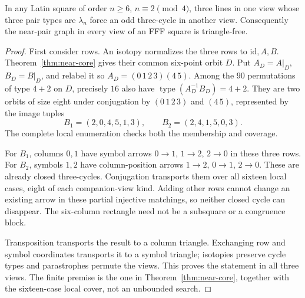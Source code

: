 \begin{computationaltheorem}
\label{thm:near-triangle}
In any Latin square of order $n\geq6$, $n\equiv2\pmod4$, three lines
in one view whose three pair types are $\lambda_n$ force an odd
three-cycle in another view. Consequently the near-pair graph in
every view of an FFF square is triangle-free.
\end{computationaltheorem}
\begin{proof}
First consider rows. An isotopy normalizes the three rows to
$\mathrm{id},A,B$. Theorem~\ref{thm:near-core} gives their common
six-point orbit $D$. Put $A_D=A|_D$, $B_D=B|_D$, and relabel it so
$A_D=(0\,1\,2\,3)(4\,5)$.
Among the $90$ permutations of type $4+2$ on $D$, precisely $16$
also have $\operatorname{type}(A_D^{-1}B_D)=4+2$. They are two orbits of
size eight under conjugation by $(0\,1\,2\,3)$ and $(4\,5)$,
represented by the image tuples
\[
 B_1=(2,0,4,5,1,3),\qquad B_2=(2,4,1,5,0,3).
\]
The complete local enumeration checks both the membership and coverage.

For $B_1$, columns $0,1$ have symbol arrows
$0\to1$, $1\to2$, $2\to0$ in these three rows. For $B_2$, symbols
$1,2$ have column-position arrows $1\to2$, $0\to1$, $2\to0$.
These are already closed three-cycles. Conjugation transports them
over all sixteen local cases, eight of each companion-view kind.
Adding other rows cannot change an existing arrow in these partial
injective matchings, so neither closed cycle can disappear.
The six-column rectangle need not be a subsquare or a congruence block.

Transposition transports the result to a column triangle. Exchanging
row and symbol coordinates transports it to a symbol triangle;
isotopies preserve cycle types and parastrophes permute the views.
This proves the statement in all three views. The finite premise is
the one in Theorem~\ref{thm:near-core}, together with the sixteen-case
local cover, not an unbounded search.
\end{proof}

